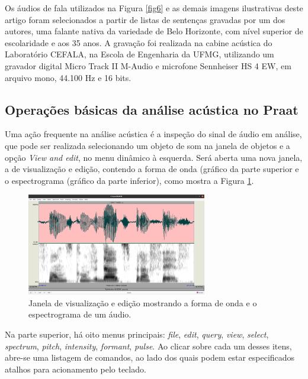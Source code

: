 \documentclass[portuguese]{textolivre}
\begin{document}
Os áudios de fala utilizados na Figura \ref{fig6} e as demais imagens ilustrativas deste artigo foram selecionados a partir de listas de sentenças gravadas por um dos autores, uma falante nativa da variedade de Belo Horizonte, com nível superior de escolaridade e aos 35 anos. A gravação foi realizada na cabine acústica do Laboratório CEFALA, na Escola de Engenharia da UFMG, utilizando um gravador digital Micro Track II M-Audio e microfone Sennheiser HS 4 EW, em arquivo mono, 44.100 Hz e 16 bits.

\subsection{Operações básicas da análise acústica no Praat}\label{sec-operacoes} 
Uma ação frequente na análise acústica é a inspeção do sinal de áudio em análise, que pode ser realizada selecionando um objeto de som na janela de objetos e a opção \textit{View and edit}, no menu dinâmico à esquerda. Será aberta uma nova janela, a de visualização e edição, contendo a forma de onda (gráfico da parte superior e o espectrograma (gráfico da parte inferior), como mostra a Figura \ref{fig7}. 

\begin{figure}[H]
 \centering
 \includegraphics[width=0.7\textwidth]{Fig7.png}
 \caption{Janela de visualização e edição mostrando a forma de onda e o espectrograma de um áudio.}
 \label{fig7}
\end{figure}

Na parte superior, há oito menus principais: \textit{file}, \textit{edit}, \textit{query}, \textit{view}, \textit{select}, \textit{spectrum}, \textit{pitch}, \textit{intensity}, \textit{formant}, \textit{pulse}. Ao clicar sobre cada um desses itens, abre-se uma listagem de comandos, ao lado dos quais podem estar especificados atalhos para acionamento pelo teclado.
\end{document}
